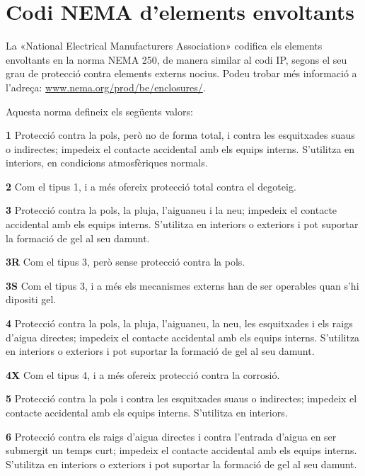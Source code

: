 \section{Codi NEMA d'elements envoltants}
 

La «National Electrical Manufacturers Association»
codifica els elements envoltants en la norma NEMA 250, de manera similar al codi IP, segons el seu grau de protecció contra elements externs nocius. Podeu trobar més informació a l'adreça: \href{http://www.nema.org/prod/be/enclosures/}{www.nema.org/prod/be/enclosures/}.

Aquesta norma defineix els següents valors:

\begin{list}{}
   {\setlength{\labelwidth}{10mm} \setlength{\leftmargin}{10mm} \setlength{\labelsep}{2mm}}
   \item[\textbf{1}] Protecció contra la pols, però no de forma total, i contra les esquitxades suaus o indirectes; impedeix el contacte accidental amb els equips interns. S'utilitza en interiors, en condicions atmosfèriques normals.
   \item[\textbf{2}] Com el tipus 1, i a més ofereix protecció total contra el degoteig.
   \item[\textbf{3}] Protecció contra la pols, la pluja, l'aiguaneu i la neu; impedeix el contacte accidental amb els equips interns. S'utilitza en interiors o exteriors i pot suportar la formació de gel al seu damunt.
   \item[\textbf{3R}] Com el tipus 3, però sense protecció contra la pols.
   \item[\textbf{3S}] Com el tipus 3, i a més els mecanismes externs han de ser operables quan s'hi dipositi gel.
    \item[\textbf{4}] Protecció contra la pols, la pluja, l'aiguaneu, la neu, les esquitxades i els raigs d'aigua directes; impedeix el contacte accidental amb els equips interns. S'utilitza en interiors o exteriors i pot suportar la formació de gel al seu damunt.
   \item[\textbf{4X}] Com el tipus 4, i a més ofereix protecció contra la corrosió.
   \item[\textbf{5}] Protecció contra la pols i contra les esquitxades suaus o indirectes; impedeix el contacte accidental amb els equips interns. S'utilitza en interiors.
   \item[\textbf{6}] Protecció contra els raigs d'aigua directes i contra l'entrada d'aigua en ser submergit un temps curt; impedeix el contacte accidental amb els equips interns. S'utilitza en interiors o exteriors i pot suportar la formació de gel al seu damunt.

\end{list}
